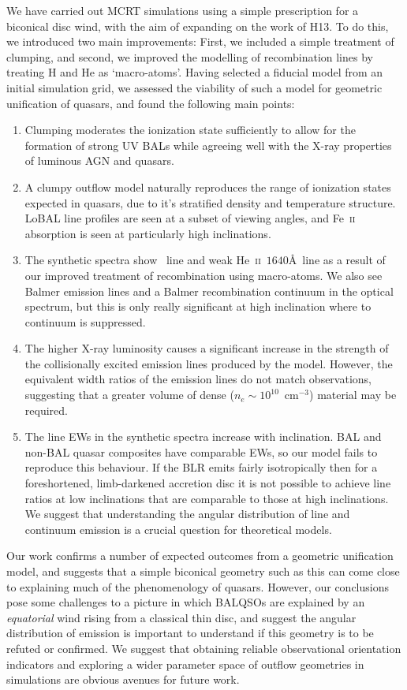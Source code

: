 \documentclass[useAMS,usenatbib]{mn2e_x}
\begin{document}
We have carried out MCRT simulations using a simple
prescription for a biconical disc wind, with
the aim of expanding on the work of H13. To do this, we introduced two main
improvements: First, we included a simple treatment of clumping, and second, 
we improved the modelling of recombination lines by treating H and He as
`macro-atoms'. Having selected a fiducial model from an initial simulation grid,
we assessed the viability of such a model for geometric 
unification of quasars, and found the following main points:
\begin{enumerate}
\item Clumping moderates the ionization state
sufficiently to allow for the 
formation of strong UV BALs while agreeing well with the X-ray
properties of luminous AGN and quasars. 
\smallskip
\item A clumpy outflow model naturally 
reproduces the range of ionization states
expected in quasars, due to it's stratified density
and temperature structure. 
LoBAL line profiles are seen at a subset of viewing angles, and Fe~\textsc{ii}
absorption is seen at particularly high inclinations. 
\smallskip
\item The synthetic spectra show \la\ line and weak He~\textsc{ii}~$1640$\AA\ line
as a result of our improved treatment of recombination using macro-atoms. We also see
Balmer emission lines and a Balmer recombination continuum in the optical spectrum, but this
is only really significant at high inclination where to continuum is suppressed.  
\smallskip
\item The higher X-ray luminosity causes a significant 
increase in the strength of the collisionally excited emission
lines produced by the model. 
However, the equivalent width ratios of the emission lines do not match
observations, suggesting that a greater volume of dense ($n_e\sim10^{10}$~cm$^{-3}$)
material may be required.
\smallskip
\item The line EWs in the synthetic spectra increase with inclination.
BAL and non-BAL quasar composites have comparable EWs, so our model
fails to reproduce this behaviour.
 If the BLR emits fairly isotropically then for a 
foreshortened, limb-darkened accretion disc 
it is not possible to achieve line ratios at low inclinations 
that are comparable to those at high inclinations. 
We suggest that understanding the angular distribution of 
line and continuum emission is a crucial question for theoretical models.
\end{enumerate}
Our work confirms a number of expected outcomes from a geometric unification 
model, and suggests that a simple biconical geometry such as this can come close to 
explaining much of the  phenomenology of quasars. However, our conclusions pose 
some challenges to a picture in which BALQSOs are
explained by an {\em equatorial} wind rising from a classical thin disc, and suggest 
the angular distribution of emission is important to understand if this 
geometry is to be refuted or confirmed. We suggest that obtaining reliable 
observational orientation indicators and 
exploring a wider parameter space of outflow geometries in simulations
are obvious avenues for future work.
\end{document}
